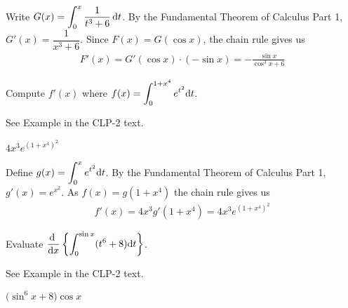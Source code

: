 \begin{solution}
Write $G(x)={\displaystyle\int_0^x \frac{1}{t^3+6}\,\mathrm{d}t}$.
By the Fundamental Theorem of Calculus Part 1, $G'(x)=\dfrac{1}{x^3+6}$.
Since $F(x)=G(\cos x)$, the chain rule gives us
\begin{align*}
F'(x)=G'(\cos x)\cdot(-\sin x)=-\frac{\sin x}{\cos^3x+6}
\end{align*}
\end{solution}



\begin{question}[1997D]
 Compute $f'(x)$ where $f(x)= \displaystyle\int_0^{1+x^4}e^{t^2}\mathrm{d}t$.
\end{question}

\begin{hint}
See Example  in the
CLP-2 text.
\end{hint}

\begin{answer}
$4x^3e^{(1+x^4)^2}$
\end{answer}

\begin{solution}
Define $g(x)= \displaystyle\int_0^x e^{t^2}\mathrm{d}t$. By the Fundamental
Theorem of Calculus Part 1, $g'(x)=e^{x^2}$. As $f(x)=g(1+x^4)$
the chain rule gives us
\begin{align*}
f'(x)=4x^3g'(1+x^4)=4x^3e^{(1+x^4)^2}
\end{align*}
\end{solution}

\begin{question}[M105 2015A]
 Evaluate $\displaystyle\diff{}{x}\left\{\int_0^{\sin x}(t^6+8)\dee{t}\right\}$.
\end{question}

\begin{hint}
See Example  in the
CLP-2 text.
\end{hint}

\begin{answer}
$\big(\sin^6 x+8)\cos x$
\end{answer}

